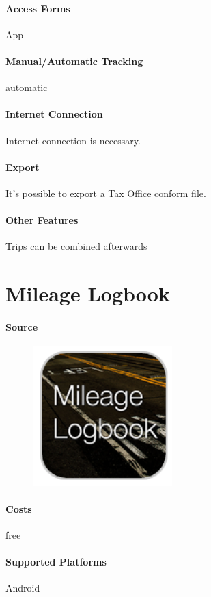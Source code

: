 \paragraph{Access Forms} App
\paragraph{Manual/Automatic Tracking} automatic
\paragraph{Internet Connection} Internet connection is necessary.
\paragraph{Export} It’s possible to export a Tax Office conform file.
\paragraph{Other Features}Trips can be combined afterwards
\newpage

\section{Mileage Logbook}
\paragraph{Source} 
\begin{figure}
  \begin{center}
    \includegraphics[width=0.48\textwidth]{mileage}
  \end{center}
\end{figure}
\paragraph{Costs} free
\paragraph{Supported Platforms} Android 
